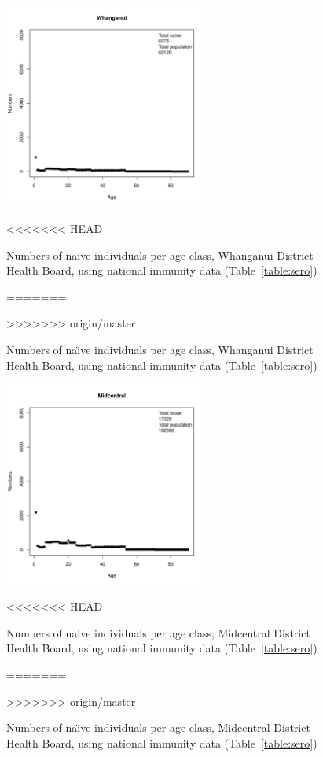 \documentclass{article}
\begin{document}
\begin{itemize}
\begin{figure}[H]
     \begin{center}
     \includegraphics[width=0.6\textwidth]{dhb11.pdf}
     \end{center}
<<<<<<< HEAD
     \caption{Numbers of naive individuals per age class, Whanganui District Health Board, using national immunity data (Table~\ref{table:sero})}
=======
     \caption{Numbers of na\"{\i}ve individuals per age class, Whanganui District Health Board, using national immunity data (Table~\ref{table:sero})}
>>>>>>> origin/master
     \label{fig:Whanganui}
\end{figure}

\begin{figure}[H]
     \begin{center}
     \includegraphics[width=0.6\textwidth]{dhb12.pdf}
     \end{center}
<<<<<<< HEAD
     \caption{Numbers of naive individuals per age class, Midcentral District Health Board, using national immunity data (Table~\ref{table:sero})}
=======
     \caption{Numbers of na\"{\i}ve individuals per age class, Midcentral District Health Board, using national immunity data (Table~\ref{table:sero})}
>>>>>>> origin/master
     \label{fig:Midcentral}
\end{figure}


\end{itemize}
\end{document}
